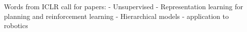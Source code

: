 \documentclass{article}[10pt]%
\begin{document}
Words from ICLR call for papers:
- Unsupervised
- Representation learning for planning and reinforcement learning
- Hierarchical models
- application to robotics




\end{document}
